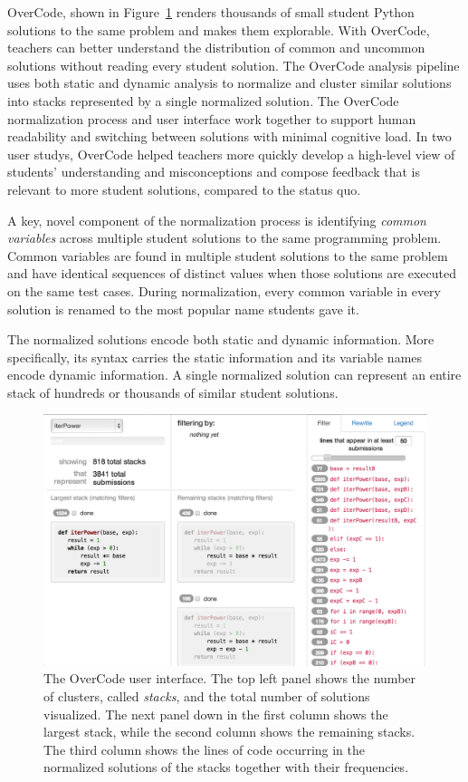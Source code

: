 OverCode, shown in Figure~\ref{fig:fullovercodeinterface} renders thousands of small student Python solutions to the same problem and makes them explorable. With OverCode, teachers can better understand the distribution of common and uncommon solutions without reading every student solution. The OverCode analysis pipeline uses both static and dynamic analysis to normalize and cluster similar solutions into stacks represented by a single normalized solution. The OverCode normalization process and user interface work together to support human readability and switching between solutions with minimal cognitive load. In two user studys, OverCode helped teachers more quickly develop a high-level view of students' understanding and misconceptions and compose feedback that is relevant to more student solutions, compared to the status quo.

A key, novel component of the normalization process is identifying {\it common variables} across multiple student solutions to the same programming problem. Common variables are found in multiple student solutions to the same problem and have identical sequences of distinct values when those solutions are executed on the same test cases. During normalization, every common variable in every solution is renamed to the most popular name students gave it. 

The normalized solutions encode both static and dynamic information. More specifically, its syntax carries the static information and its variable names encode dynamic information. A single normalized solution can represent an entire stack of hundreds or thousands of similar student solutions.

\begin{figure}
\centering
\includegraphics[width=1.0\linewidth]{Body/figures/interfaceScreenShot.png}
\caption{The OverCode user interface. The top left panel shows the number of clusters, called {\it stacks}, and the total number of solutions visualized. The next panel down in the first column shows the largest stack, while the second column shows the remaining stacks. The third column shows the lines of code occurring in the normalized solutions of the stacks together with their frequencies.}
\label{fig:fullovercodeinterface}
\end{figure}


